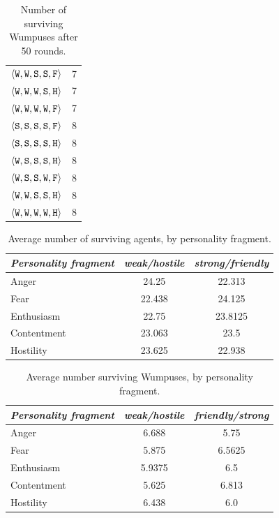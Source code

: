 \begin{table}
{{\begin{minipage}[b]{0.42\hsize}
\begin{tabular}{ l | c }
					$\langle \mathtt{W},\mathtt{W}, \mathtt{S}, \mathtt{S}, \mathtt{F} \rangle$ & 7\\
					$\langle \mathtt{W},\mathtt{W}, \mathtt{W}, \mathtt{S}, \mathtt{H} \rangle$ & 7\\
					$\langle \mathtt{W},\mathtt{W}, \mathtt{W}, \mathtt{W}, \mathtt{F} \rangle$ & 7\\
					$\langle \mathtt{S},\mathtt{S}, \mathtt{S}, \mathtt{S}, \mathtt{F} \rangle$ & 8\\
					$\langle \mathtt{S},\mathtt{S}, \mathtt{S}, \mathtt{S}, \mathtt{H} \rangle$ & 8\\
					$\langle \mathtt{W},\mathtt{S}, \mathtt{S}, \mathtt{S}, \mathtt{H} \rangle$ & 8\\
					$\langle \mathtt{W},\mathtt{S}, \mathtt{S}, \mathtt{W}, \mathtt{F} \rangle$ & 8\\
					$\langle \mathtt{W},\mathtt{W}, \mathtt{S}, \mathtt{S}, \mathtt{H} \rangle$ & 8\\
					$\langle \mathtt{W},\mathtt{W}, \mathtt{W}, \mathtt{W}, \mathtt{H} \rangle$ & 8\\
					\hline
				\end{tabular}
				\caption{Number of surviving Wumpuses after 50 rounds.}
				\label{tab:numWumpuses}
			\end{minipage}
			\hfill
		}}
	\end{table}
	
\begin{table}
	\centering
	\begin{tabular}{ l | c | c }
		\emph{Personality fragment} & \emph{weak/hostile} & \emph{ strong/friendly} \\
		\hline
			Anger & 24.25 & 22.313\\
			Fear & 22.438 & 24.125\\
			Enthusiasm & 22.75 & 23.8125\\
			Contentment & 23.063 & 23.5\\
			Hostility & 23.625 & 22.938\\
		\hline
	\end{tabular}
	\caption{Average number of surviving agents, by personality fragment.}
	\label{tab:numAgentsAvg}
\end{table}

\begin{table}
	\centering
	\begin{tabular}{ l | c | c }
		\emph{Personality fragment} & \emph{weak/hostile} & \emph{friendly/strong} \\
			\hline
			Anger & 6.688 & 5.75\\
			Fear & 5.875 & 6.5625\\
			Enthusiasm & 5.9375 & 6.5\\
			Contentment & 5.625 & 6.813\\
			Hostility & 6.438 & 6.0\\
		\hline
	\end{tabular}
	\caption{Average number surviving Wumpuses, by personality fragment.}
	\label{tab:numWumpusesAvg}
\end{table}

